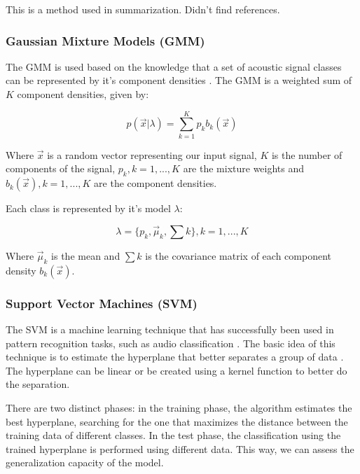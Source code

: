 \documentclass[12pt]{article}
\begin{document}
This is a method used in summarization. Didn't find references.

\subsubsection{Gaussian Mixture Models (GMM)} \label{class:gmm}


The GMM is used based on the knowledge that a set of acoustic signal classes can be represented by it's component densities \cite{reynolds1995robust}. The GMM is a weighted sum of $K$ component densities, given by:

\begin{equation}
	p(\vec{x}|\lambda) = \sum_{k=1}^{K} p_kb_k(\vec{x})
	\label{eq:gmm}
\end{equation}

Where $\vec{x}$ is a random vector representing our input signal, $K$ is the number of components of the signal, $p_k, k = 1,...,K$ are the mixture weights and $b_k(\vec{x}), k = 1,...,K$ are the component densities.

Each class is represented by it's model $\lambda$:

\begin{equation}
	\lambda = \{ p_k, \vec{\mu}_k, \sum k \}, k = 1,...,K
	\label{eq:lambda}
\end{equation}

Where $\vec{\mu}_k$ is the mean and $\sum k$ is the covariance matrix of each component density $b_k(\vec{x})$.



\subsubsection{Support Vector Machines (SVM)} \label{class:svm}


The SVM is a machine learning technique that has successfully been used in pattern recognition tasks, such as audio classification \cite{dhanalakshmi2009classification}. The basic idea of this technique is to estimate the hyperplane that better separates a group of data \cite{cumani2012analysis}. The hyperplane can be linear or be created using a kernel function to better do the separation.

There are two distinct phases: in the training phase, the algorithm estimates the best hyperplane, searching for the one that maximizes the distance between the training data of different classes. In the test phase, the classification using the trained hyperplane is performed using different data. This way, we can assess the generalization capacity of the model.
\end{document}
